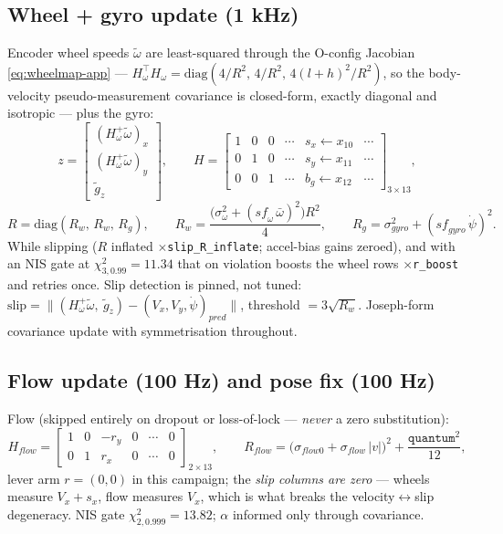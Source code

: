 \documentclass[11pt]{article}
\begin{document}
\subsection{Wheel + gyro update (1 kHz)}
Encoder wheel speeds $\tilde\omega$ are least-squared through the O-config Jacobian
\eqref{eq:wheelmap-app} --- $H_\omega^\top H_\omega=\mathrm{diag}(4/R^2,\,4/R^2,\,4(l{+}h)^2/R^2)$,
so the body-velocity pseudo-measurement covariance is closed-form, exactly diagonal and
isotropic --- plus the gyro:
\begin{equation}
z=\begin{bmatrix}(H_\omega^{+}\tilde\omega)_{x}\\ (H_\omega^{+}\tilde\omega)_{y}\\ \tilde g_z\end{bmatrix},
\qquad
H=\begin{bmatrix}1&0&0&\cdots&s_x\leftarrow\!x_{10}&\cdots\\ 0&1&0&\cdots&s_y\leftarrow\!x_{11}&\cdots\\
0&0&1&\cdots&b_g\leftarrow\!x_{12}&\cdots\end{bmatrix}_{3\times13},
\end{equation}
\begin{equation}
R=\mathrm{diag}(R_w,\,R_w,\,R_g),\qquad
R_w=\frac{\big(\sigma_\omega^2+(\mathit{sf}_\omega\,\bar\omega)^2\big)R^2}{4},\qquad
R_g=\sigma_{gyro}^2+(\mathit{sf}_{gyro}\,\dot\psi)^2 .
\end{equation}
While slipping ($R$ inflated $\times$\texttt{slip\_R\_inflate}; accel-bias gains zeroed),
and with an NIS gate at $\chi^2_{3,0.99}=11.34$ that on violation boosts the wheel rows
$\times$\texttt{r\_boost} and retries once. Slip detection is pinned, not tuned:
$\mathrm{slip} = \|(H_\omega^{+}\tilde\omega,\ \tilde g_z)-(V_x,V_y,\dot\psi)_{pred}\|$,
threshold $=3\sqrt{R_w}$. Joseph-form covariance update with symmetrisation throughout.

\subsection{Flow update (100 Hz) and pose fix (100 Hz)}
Flow (skipped entirely on dropout or loss-of-lock --- \emph{never} a zero substitution):
\begin{equation}
H_{flow}=\begin{bmatrix}1&0&-r_y&0&\cdots&0\\ 0&1&r_x&0&\cdots&0\end{bmatrix}_{2\times13},
\qquad
R_{flow}=\big(\sigma_{flow0}+\sigma_{flow}\,|v|\big)^2+\frac{\texttt{quantum}^2}{12},
\end{equation}
lever arm $r=(0,0)$ in this campaign; the \emph{slip columns are zero} --- wheels measure
$V_x+s_x$, flow measures $V_x$, which is what breaks the velocity$\leftrightarrow$slip
degeneracy. NIS gate $\chi^2_{2,0.999}=13.82$; $\alpha$ informed only through covariance.
\end{document}
